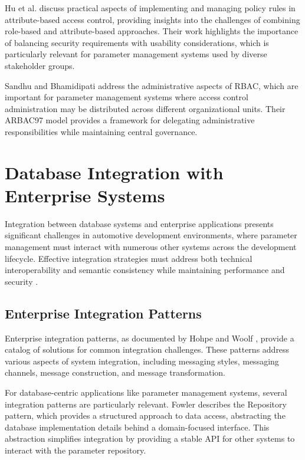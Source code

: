 Hu et al. \cite{hu2015implementing} discuss practical aspects of implementing and managing policy rules in attribute-based access control, providing insights into the challenges of combining role-based and attribute-based approaches. Their work highlights the importance of balancing security requirements with usability considerations, which is particularly relevant for parameter management systems used by diverse stakeholder groups.

Sandhu and Bhamidipati \cite{sandhu1997arbac97} address the administrative aspects of \ac{RBAC}, which are important for parameter management systems where access control administration may be distributed across different organizational units. Their ARBAC97 model provides a framework for delegating administrative responsibilities while maintaining central governance.

\section{Database Integration with Enterprise Systems}
\label{sec:database-integration}

Integration between database systems and enterprise applications presents significant challenges in automotive development environments, where parameter management must interact with numerous other systems across the development lifecycle. Effective integration strategies must address both technical interoperability and semantic consistency while maintaining performance and security \cite{hohpe2002enterprise}.

\subsection{Enterprise Integration Patterns}
\label{subsec:enterprise-integration-patterns}

Enterprise integration patterns, as documented by Hohpe and Woolf \cite{hohpe2002enterprise}, provide a catalog of solutions for common integration challenges. These patterns address various aspects of system integration, including messaging styles, messaging channels, message construction, and message transformation.

For database-centric applications like parameter management systems, several integration patterns are particularly relevant. Fowler \cite{fowler2003patterns} describes the Repository pattern, which provides a structured approach to data access, abstracting the database implementation details behind a domain-focused interface. This abstraction simplifies integration by providing a stable API for other systems to interact with the parameter repository.

